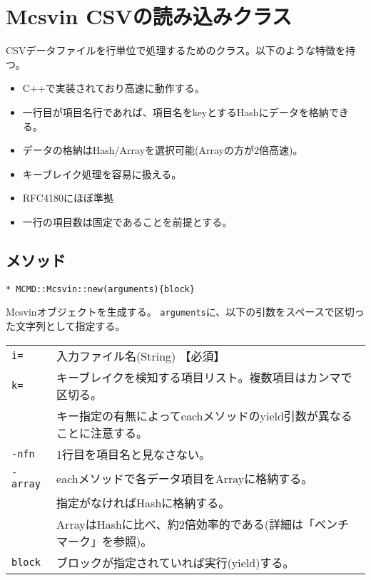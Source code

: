 
%

\section{Mcsvin CSVの読み込みクラス\label{sect:mcsvinRB}}
CSVデータファイルを行単位で処理するためのクラス。以下のような特徴を持つ。
\begin{itemize}
\setlength{\itemindent}{0mm}
\item C++で実装されており高速に動作する。
\item 一行目が項目名行であれば、項目名をkeyとするHashにデータを格納できる。
\item データの格納はHash/Arrayを選択可能(Arrayの方が2倍高速)。
\item キーブレイク処理を容易に扱える。
\item RFC4180にほぼ準拠
\item 一行の項目数は固定であることを前提とする。
\end{itemize}

\subsection{メソッド}

{\Large
\begin{verbatim}
* MCMD::Mcsvin::new(arguments){block}
\end{verbatim}
}

Mcsvinオブジェクトを生成する。
\verb|arguments|に、以下の引数をスペースで区切った文字列として指定する。

\begin{table}[htbp]
\begin{tabular}{ll}
\verb|i=|    & 入力ファイル名(String) 【必須】\\
\verb|k=|    & キーブレイクを検知する項目リスト。複数項目はカンマで区切る。\\
             & キー指定の有無によってeachメソッドのyield引数が異なることに注意する。\\
\verb|-nfn|  & 1行目を項目名と見なさない。\\
\verb|-array|& eachメソッドで各データ項目をArrayに格納する。\\
             & 指定がなければHashに格納する。\\
             & ArrayはHashに比べ、約2倍効率的である(詳細は「ベンチマーク」を参照)。\\
\verb|block| & ブロックが指定されていれば実行(yield)する。\\
\end{tabular} 
\end{table} 

